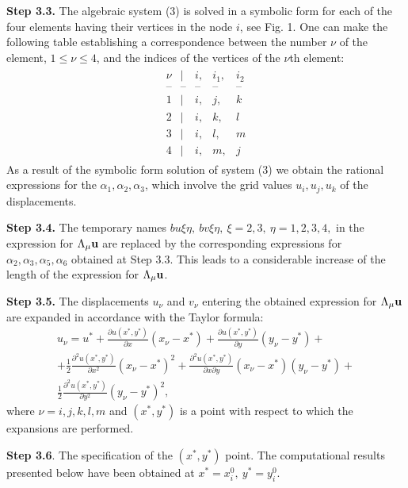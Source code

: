  {\bf Step 3.3.} The algebraic system (3) is solved in a symbolic form for each
of the four elements having their vertices in the node $i$, see Fig. 1. One
can make the following table establishing a correspondence between
the number $\nu$ of the element, $1\leq \nu\leq 4$, and the indices of the
vertices of the $\nu$th element:
\begin{eqnarray}
\begin{array}{lclll}
\nu & | & i, & i_1, & i_2\\
\mbox{--}&\mbox{--}&\mbox{--}&\mbox{--}&\mbox{--}\\
1 & | & i, & j,   & k  \\
2 & | & i, & k, & l\\
3 & | & i, & l, & m\\
4 & | & i, & m, & j
\end{array}
\end{eqnarray}
As a result of the symbolic form solution of system (3) we obtain the rational
expressions for the $\alpha_1,\alpha_2,\alpha_3$, which involve the grid
values $u_i,u_j,u_k$ of the displacements.

 {\bf Step 3.4.} The temporary names $bu\xi\eta,~bv\xi\eta,~\xi=2,3,~\eta=
1,2,3,4,$ in the expression for $\Lambda_\mu{\bf u}$ are replaced by the
corresponding expressions for $\alpha_2,\alpha_3,\alpha_5,\alpha_6$ obtained
at Step 3.3. This leads to a considerable increase of the length of the
expression for $\Lambda_\mu{\bf u}$.

  {\bf Step 3.5.} The displacements $u_\nu$ and $v_\nu$ entering the obtained
expression for $\Lambda_\mu{\bf u}$ are expanded in accordance with the
Taylor formula:
\begin{eqnarray}
u_{\nu}=u^* +\frac{\partial u(x^*,y^*)}{\partial x}(x_{\nu}-x^*) +
\frac{\partial u(x^*,y^*)}{\partial y}(y_{\nu}-y^*)+ \nonumber\\
+\frac{1}{2}\frac{\partial^2 u(x^*,y^*)}{\partial x^2}(x_{\nu}-x^*)^2+
\frac{\partial^2 u(x^*,y^*)}{\partial x\partial y}(x_{\nu}-x^*)(y_{\nu}
-y^*)+\nonumber\\
\frac{1}{2}\frac{\partial^2 u(x^*,y^*)}{\partial y^2}(y_\nu-y^*)^2,
\end{eqnarray}
where $\nu=i,j,k,l,m$ and $(x^*,y^*)$ is a point with respect to
which the expansions are performed.

   {\bf Step 3.6}. The specification of the $(x^*,y^*)$ point.
The computational results presented below have been obtained at $x^*=x_i^0,~
y^*=y_i^0$.

